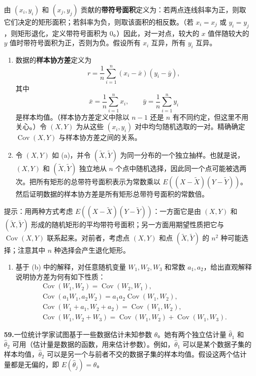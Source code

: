 \documentclass[UTF8,12pt,a4paper,fontset=fandol]{ctexart}
\begin{document}
由 $(x_i,y_i)$ 和 $(x_j,y_j)$ 贡献的\textbf{带符号面积}定义为：若两点连线斜率为正，则取它们决定的矩形面积；若斜率为负，则取该面积的相反数。（若 $x_i=x_j$ 或 $y_i=y_j$，则矩形退化，定义带符号面积为 $0$。）因此，对一对点，较大的 $x$ 值伴随较大的 $y$ 值时带符号面积为正，否则为负。假设所有 $x_i$ 互异，所有 $y_i$ 互异。
\begin{enumerate}
  \item[(a)] 数据的\textbf{样本协方差}定义为
  \[
    r=\frac1n\sum_{i=1}^{n}(x_i-\bar x)(y_i-\bar y),
  \]
  其中
  \[
    \bar x=\frac1n\sum_{i=1}^{n}x_i,\qquad
    \bar y=\frac1n\sum_{i=1}^{n}y_i
  \]
  是样本均值。（样本协方差定义中除以 $n-1$ 还是 $n$ 有不同约定，但这里不用关心。）令 $(X,Y)$ 为从这些 $(x_i,y_i)$ 对中均匀随机选取的一对。精确确定 $\operatorname{Cov}(X,Y)$ 与样本协方差之间的关系。
  \item[(b)] 令 $(X,Y)$ 如 (a)，并令 $(\tilde X,\tilde Y)$ 为同一分布的一个独立抽样。也就是说，$(X,Y)$ 和 $(\tilde X,\tilde Y)$ 独立地从 $n$ 个点中随机选择，因此同一个点可能被选两次。把所有矩形的总带符号面积表示为常数乘以 $E((X-\tilde X)(Y-\tilde Y))$。然后证明数据的样本协方差是所有矩形总带符号面积的常数倍。
\end{enumerate}
提示：用两种方式考虑 $E((X-\tilde X)(Y-\tilde Y))$：一方面它是由 $(X,Y)$ 和 $(\tilde X,\tilde Y)$ 形成的随机矩形的平均带符号面积；另一方面用期望性质把它与 $\operatorname{Cov}(X,Y)$ 联系起来。对前者，考虑点 $(X,Y)$ 和点 $(\tilde X,\tilde Y)$ 的 $n^2$ 种可能选择；注意其中 $n$ 种选择会产生退化矩形。
\begin{enumerate}
  \item[(c)] 基于 (b) 中的解释，对任意随机变量 $W_1,W_2,W_3$ 和常数 $a_1,a_2$，给出直观解释说明协方差为何有如下性质：
  \[
  \begin{gathered}
    \operatorname{Cov}(W_1,W_2)=\operatorname{Cov}(W_2,W_1),\\
    \operatorname{Cov}(a_1W_1,a_2W_2)=a_1a_2\operatorname{Cov}(W_1,W_2),\\
    \operatorname{Cov}(W_1+a_1,W_2+a_2)=\operatorname{Cov}(W_1,W_2),\\
    \operatorname{Cov}(W_1,W_2+W_3)=\operatorname{Cov}(W_1,W_2)+\operatorname{Cov}(W_1,W_3).
  \end{gathered}
  \]
\end{enumerate}

\noindent\textbf{59.}\quad 一位统计学家试图基于一些数据估计未知参数 $\theta$。她有两个独立估计量 $\hat\theta_1$ 和 $\hat\theta_2$ 可用（估计量是数据的函数，用来估计参数）。例如，$\hat\theta_1$ 可以是某个数据子集的样本均值，$\hat\theta_2$ 可以是另一个与前者不交的数据子集的样本均值。假设这两个估计量都是无偏的，即 $E(\hat\theta_j)=\theta$。
\end{document}
